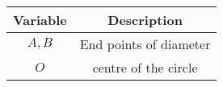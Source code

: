 \begin{tabular}[12pt]{ |c| c|}
    \hline
    \textbf{Variable} & \textbf{Description}\\ 
    \hline
    $A,B$ & End points of diameter \\
    \hline
    $O$ & centre of the circle \\
    \hline
\end{tabular}
